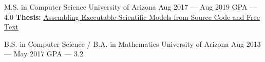 

\begin{cventries}

  \cventry
    {M.S. in Computer Science} %
    {University of Arizona} %
    {Aug 2017 --- Aug 2019} %
    {GPA --- 4.0} %
    {\textbf{Thesis:} \href{https://repository.arizona.edu/handle/10150/634301}{\underline{Assembling Executable Scientific Models from Source Code and Free Text}}}

    \cventry
      {B.S. in Computer Science / B.A. in Mathematics} %
      {University of Arizona} %
      {Aug 2013 --- May 2017} %
      {GPA --- 3.2} %
      {}
    \vspace{-1cm}
\end{cventries}
